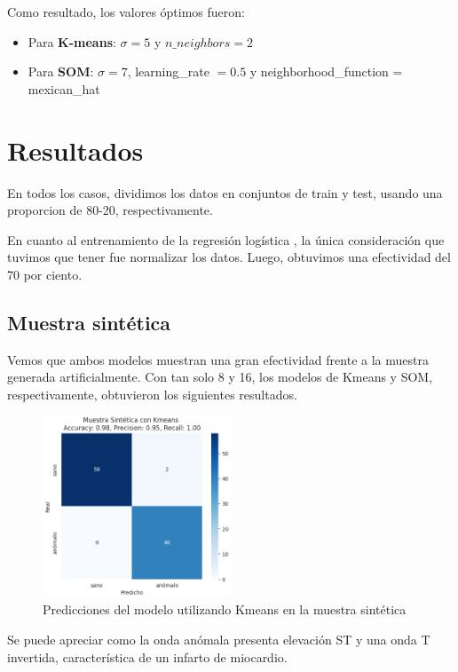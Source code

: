 \documentclass[titlepage,a4paper]{article}
\begin{document}
Como resultado, los valores óptimos fueron:
\begin{itemize}
    \item Para \textbf{K-means}: $\sigma = 5$ y $n\_neighbors = 2$
    \item Para \textbf{SOM}: $\sigma = 7$, learning\_rate $= 0.5$ y neighborhood\_function = mexican\_hat
\end{itemize}

\section{Resultados}
En todos los casos, dividimos los datos en conjuntos de train y test, usando una proporcion de 80-20, respectivamente.

En cuanto al entrenamiento de la regresión logística , la única consideración que tuvimos que tener fue normalizar los datos. Luego, obtuvimos una efectividad del 70 por ciento. 

\subsection{Muestra sintética}
Vemos que ambos modelos muestran una gran efectividad frente a la muestra generada artificialmente. Con tan solo 8 y 16, los modelos de Kmeans y SOM, respectivamente, obtuvieron los siguientes resultados.

\begin{figure}[H] %
    \centering
    \includegraphics[width=0.5\textwidth]{test_kmeans_sintetico.png} %
    \caption{Predicciones del modelo utilizando Kmeans en la muestra sintética}
    \label{fig:mi_figura} %
\end{figure}
Se puede apreciar como la onda anómala presenta elevación ST y una onda T invertida, característica de un infarto de miocardio.
\end{document}
